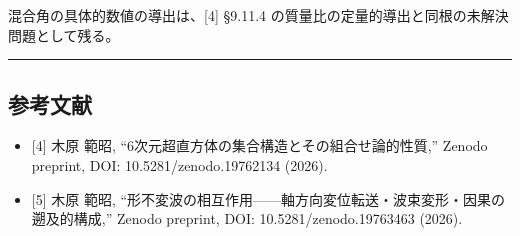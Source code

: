 \documentclass[
  a4paper,11pt]{ltjsarticle}
\providecommand{\tightlist}{%
  \setlength{\itemsep}{0pt}\setlength{\parskip}{0pt}}
\begin{document}
混合角の具体的数値の導出は、{[}4{]} §9.11.4
の質量比の定量的導出と同根の未解決問題として残る。

\begin{center}\rule{0.5\linewidth}{0.5pt}\end{center}

\subsection{参考文献}\label{ux53c2ux8003ux6587ux732e}

\begin{itemize}
\tightlist
\item
  {[}4{]} 木原 範昭, ``6次元超直方体の集合構造とその組合せ論的性質,''
  Zenodo preprint, DOI: 10.5281/zenodo.19762134 (2026).
\item
  {[}5{]} 木原 範昭,
  ``形不変波の相互作用------軸方向変位転送・波束変形・因果の遡及的構成,''
  Zenodo preprint, DOI: 10.5281/zenodo.19763463 (2026).
\end{itemize}
\end{document}
